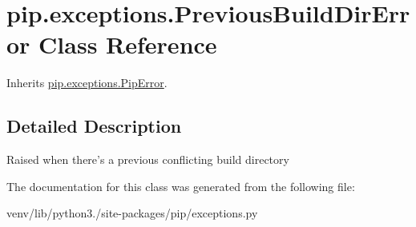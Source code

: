 \hypertarget{classpip_1_1exceptions_1_1_previous_build_dir_error}{}\section{pip.\+exceptions.\+Previous\+Build\+Dir\+Error Class Reference}
\label{classpip_1_1exceptions_1_1_previous_build_dir_error}


Inherits \hyperlink{classpip_1_1exceptions_1_1_pip_error}{pip.\+exceptions.\+Pip\+Error}.



\subsection{Detailed Description}
\begin{DoxyVerb}Raised when there's a previous conflicting build directory\end{DoxyVerb}
 

The documentation for this class was generated from the following file\+:\begin{DoxyCompactItemize}
\item 
venv/lib/python3./site-\/packages/pip/exceptions.\+py\end{DoxyCompactItemize}
